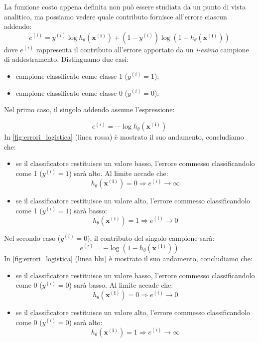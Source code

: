 La funzione costo appena definita non può essere studiata da un punto di vista analitico, ma possiamo vedere quale contributo fornisce all'errore ciascun addendo:
 \begin{equation*}
  e^{(i)} = {y^{(i)}}\log{h_\theta(\mathbf{x^{(i)}})} + (1-y^{(i)})
 \log{(1 - h_\theta(\mathbf{x^{(i)}}))}
\end{equation*}
dove $e^{(i)}$ rappresenta il contributo all'errore apportato da un \emph{i-esimo} campione di addestramento.
 Distinguamo due casi:
\begin{itemize}
\item campione classificato come classe 1  ($y^{(i)}=1$);
\item campione classificato come classe 0 ($y^{(i)}=0$).
\end{itemize}
Nel primo caso, il singolo addendo assume l'espressione:

 \begin{equation*}
 e^{(i)}=-\log{h_\theta(\mathbf{x^{(i)}})} 
 \end{equation*}
 In \autoref{fig:errori_logistica} (linea rossa) è mostrato il suo andamento, concludiamo che:
\begin{itemize}
\item se il classificatore restituisce un valore basso, l'errore commesso classificandolo come 1 ($y^{(i)}=1$) sarà alto. Al limite accade che:
\begin{equation*}
h_\theta(\mathbf{x^{(i)}}) = 0 \Rightarrow e^{(i)} \rightarrow \infty
\end{equation*}
\item se il classificatore restituisce un valore alto, l'errore commesso classificandolo come 1 ($y^{(i)}=1$) sarà basso:
\begin{equation*}
h_\theta(\mathbf{x^{(i)}}) = 1 \Rightarrow e^{(i)} \rightarrow 0
\end{equation*}
\end{itemize}
Nel secondo caso ($y^{(i)}=0$), il contributo del singolo campione sarà:
\begin{equation*}
 e^{(i)}=-\log{(1-h_\theta(\mathbf{x^{(i)}}))} 
 \end{equation*}
In \autoref{fig:errori_logistica} (linea blu) è mostrato il suo andamento, concludiamo che:
\begin{itemize}
\item se il classificatore restituisce un valore basso, l'errore commesso classificandolo come 0 ($y^{(i)}=0$) sarà basso. Al limite accade che:
\begin{equation*}
h_\theta(\mathbf{x^{(i)}}) = 0 \Rightarrow e^{(i)} \rightarrow 0
\end{equation*}
\item se il classificatore restituisce un valore alto, l'errore commesso classificandolo come 0 ($y^{(i)}=0$) sarà alto:
\begin{equation*}
h_\theta(\mathbf{x^{(i)}}) = 1 \Rightarrow e^{(i)} \rightarrow \infty
\end{equation*}
\end{itemize}

